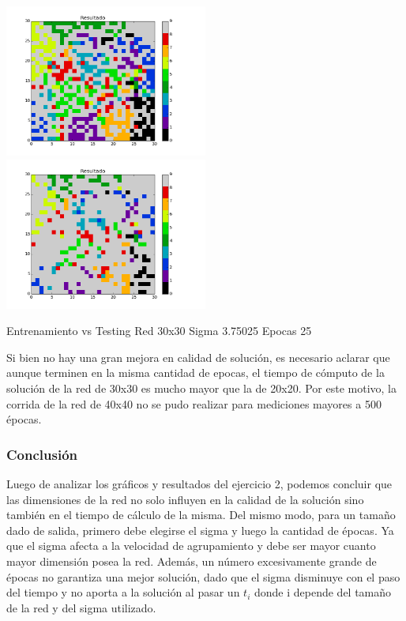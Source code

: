 \includegraphics[width=0.5\textwidth]{img/Ej2_Epocas/train_M_30_sigma_3_75025_epocas_25}
\includegraphics[width=0.5\textwidth]{img/Ej2_Epocas/test_M_30_sigma_3_75025_epocas_25}
{\center \footnotesize Entrenamiento vs Testing Red 30x30 Sigma 3.75025 Epocas 25\par}

Si bien no hay una gran mejora en calidad de soluci\'on, es necesario aclarar que aunque terminen en la misma cantidad de epocas, el tiempo de c\'omputo de la soluci\'on de la red de 30x30 es mucho mayor que la de 20x20. Por este motivo, la corrida de la red de 40x40 no se pudo realizar para mediciones mayores a 500 \'epocas.

\subsubsection{Conclusi\'on}

Luego de analizar los gr\'aficos y resultados del ejercicio 2, podemos concluir que las dimensiones de la red no solo influyen en la calidad de la soluci\'on sino tambi\'en en el tiempo de c\'alculo de la misma. Del mismo modo, para un tama\~no dado de salida, primero debe elegirse el sigma y luego la cantidad de \'epocas. Ya que el sigma afecta a la velocidad de agrupamiento y debe ser mayor cuanto mayor dimensi\'on posea la red. Adem\'as, un n\'umero excesivamente grande de \'epocas no garantiza una mejor soluci\'on, dado que el sigma disminuye con el paso del tiempo y no aporta a la soluci\'on al pasar un $t_i$ donde i depende del tama\~no de la red y del sigma utilizado.

